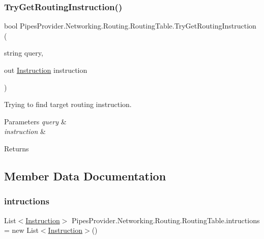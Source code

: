 \subsubsection{\texorpdfstring{Try\+Get\+Routing\+Instruction()}{TryGetRoutingInstruction()}}
{\footnotesize\ttfamily bool Pipes\+Provider.\+Networking.\+Routing.\+Routing\+Table.\+Try\+Get\+Routing\+Instruction (\begin{DoxyParamCaption}\item[{string}]{query,  }\item[{out \mbox{\hyperlink{class_pipes_provider_1_1_networking_1_1_routing_1_1_instruction}{Instruction}}}]{instruction }\end{DoxyParamCaption})}



Trying to find target routing instruction. 


\begin{DoxyParams}{Parameters}
{\em query} & \\
\hline
{\em instruction} & \\
\hline
\end{DoxyParams}
\begin{DoxyReturn}{Returns}

\end{DoxyReturn}


\subsection{Member Data Documentation}
\mbox{\label{class_pipes_provider_1_1_networking_1_1_routing_1_1_routing_table_a1a2c8459b4805d7ee1e81698a389f3f7}} 
\subsubsection{\texorpdfstring{intructions}{intructions}}
{\footnotesize\ttfamily List$<$\mbox{\hyperlink{class_pipes_provider_1_1_networking_1_1_routing_1_1_instruction}{Instruction}}$>$ Pipes\+Provider.\+Networking.\+Routing.\+Routing\+Table.\+intructions = new List$<$\mbox{\hyperlink{class_pipes_provider_1_1_networking_1_1_routing_1_1_instruction}{Instruction}}$>$()}



